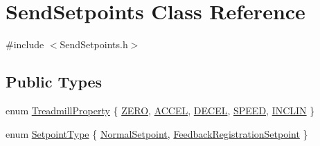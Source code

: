 \hypertarget{class_send_setpoints}{}\section{Send\+Setpoints Class Reference}
\label{class_send_setpoints}


{\ttfamily \#include $<$Send\+Setpoints.\+h$>$}

\subsection*{Public Types}
\begin{DoxyCompactItemize}
\item 
enum \hyperlink{class_send_setpoints_a1205563976ed70d7beace23697cd0b06}{Treadmill\+Property} \{ \newline
\hyperlink{class_send_setpoints_a1205563976ed70d7beace23697cd0b06a2eb9b2d6da28dccc96fbbab36cdfc6b3}{Z\+E\+RO}, 
\hyperlink{class_send_setpoints_a1205563976ed70d7beace23697cd0b06a7cdbb0abf495f41b75cff01301144364}{A\+C\+C\+EL}, 
\hyperlink{class_send_setpoints_a1205563976ed70d7beace23697cd0b06ace9d9192627b6b15f72f096dce07326f}{D\+E\+C\+EL}, 
\hyperlink{class_send_setpoints_a1205563976ed70d7beace23697cd0b06aa2c57f9454b108c1226620daa3a86493}{S\+P\+E\+ED}, 
\newline
\hyperlink{class_send_setpoints_a1205563976ed70d7beace23697cd0b06a860d8cc1cb03a74d48e7c0d7972902a7}{I\+N\+C\+L\+IN}
 \}
\item 
enum \hyperlink{class_send_setpoints_a36f865e2cf8a800b6226ff7b6b03abcd}{Setpoint\+Type} \{ \hyperlink{class_send_setpoints_a36f865e2cf8a800b6226ff7b6b03abcdaa68dfe27deefd92f0a1548a7478780dc}{Normal\+Setpoint}, 
\hyperlink{class_send_setpoints_a36f865e2cf8a800b6226ff7b6b03abcda8b11ecfc5573d2a58891d82542d7e52a}{Feedback\+Registration\+Setpoint}
 \}
\end{DoxyCompactItemize}
